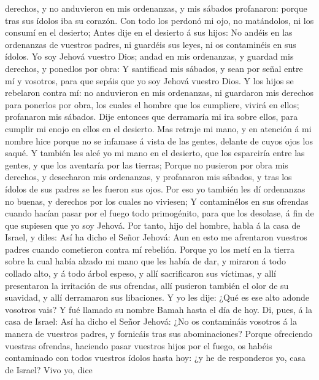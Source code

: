 derechos, y no anduvieron en mis ordenanzas, y mis sábados profanaron:
porque tras sus ídolos iba su corazón.  Con todo los
perdonó mi ojo, no matándolos, ni los consumí en el desierto;
 Antes dije en el desierto á sus hijos: No andéis en las
ordenanzas de vuestros padres, ni guardéis sus leyes, ni os contaminéis
en sus ídolos.  Yo soy Jehová vuestro Dios; andad en mis
ordenanzas, y guardad mis derechos, y ponedlos por obra: 
Y santificad mis sábados, y sean por señal entre mí y vosotros, para que
sepáis que yo soy Jehová vuestro Dios.  Y los hijos se
rebelaron contra mí: no anduvieron en mis ordenanzas, ni guardaron mis
derechos para ponerlos por obra, los cuales el hombre que los cumpliere,
vivirá en ellos; profanaron mis sábados. Dije entonces que derramaría mi
ira sobre ellos, para cumplir mi enojo en ellos en el desierto.
 Mas retraje mi mano, y en atención á mi nombre hice
porque no se infamase á vista de las gentes, delante de cuyos ojos los
saqué.  Y también les alcé yo mi mano en el desierto, que
los esparciría entre las gentes, y que los aventaría por las tierras;
 Porque no pusieron por obra mis derechos, y desecharon
mis ordenanzas, y profanaron mis sábados, y tras los ídolos de sus
padres se les fueron sus ojos.  Por eso yo también les dí
ordenanzas no buenas, y derechos por los cuales no viviesen;
 Y contaminélos en sus ofrendas cuando hacían pasar por
el fuego todo primogénito, para que los desolase, á fin de que supiesen
que yo soy Jehová.  Por tanto, hijo del hombre, habla á
la casa de Israel, y diles: Así ha dicho el Señor Jehová: Aun en esto me
afrentaron vuestros padres cuando cometieron contra mí rebelión.
 Porque yo los metí en la tierra sobre la cual había
alzado mi mano que les había de dar, y miraron á todo collado alto, y á
todo árbol espeso, y allí sacrificaron sus víctimas, y allí presentaron
la irritación de sus ofrendas, allí pusieron también el olor de su
suavidad, y allí derramaron sus libaciones.  Y yo les
dije: ¿Qué es ese alto adonde vosotros vais? Y fué llamado su nombre
Bamah hasta el día de hoy.  Di, pues, á la casa de
Israel: Así ha dicho el Señor Jehová: ¿No os contamináis vosotros á la
manera de vuestros padres, y fornicáis tras sus abominaciones?
 Porque ofreciendo vuestras ofrendas, haciendo pasar
vuestros hijos por el fuego, os habéis contaminado con todos vuestros
ídolos hasta hoy: ¿y he de responderos yo, casa de Israel? Vivo yo, dice
